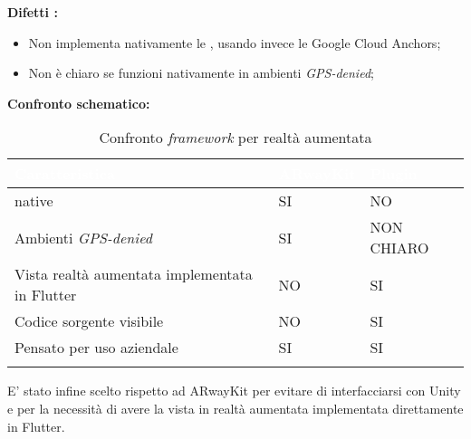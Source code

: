 \textbf{Difetti \aplug{}:}
\begin{itemize}
  \item Non implementa nativamente le \asa{}, usando invece le Google Cloud Anchors;
  \item Non è chiaro se funzioni nativamente in ambienti \textit{GPS-denied};
\end{itemize}

\textbf{Confronto schematico:}

{
  \setlength{\freewidth}{\dimexpr\textwidth-10\tabcolsep}
  \renewcommand{\arraystretch}{1.5}
  \centering
  \setlength{\aboverulesep}{0pt}
  \setlength{\belowrulesep}{0pt}
  \begin{longtable}{C{.6\freewidth} C{.2\freewidth} C{.2\freewidth}} 
     \toprule 
  \textcolor{white}{\textbf{Caratteristica}} &
  \textcolor{white}{\textbf{ARwayKit}} &
  \textcolor{white}{\textbf{Plugin}}\\
  \midrule
  \endhead
  
  \asa{} native & SI & NO\\
  Ambienti \textit{GPS-denied} & SI & NON CHIARO\\
  Vista realtà aumentata implementata in Flutter & NO & SI\\
  Codice sorgente visibile & NO & SI\\
  Pensato per uso aziendale & SI & SI\\

  \bottomrule
  \caption{Confronto \textit{framework} per realtà aumentata}
  \end{longtable}
}

E' stato infine scelto \aplug{} rispetto ad ARwayKit per evitare di interfacciarsi con Unity e per la necessità di avere la vista in realtà aumentata implementata direttamente in Flutter.

